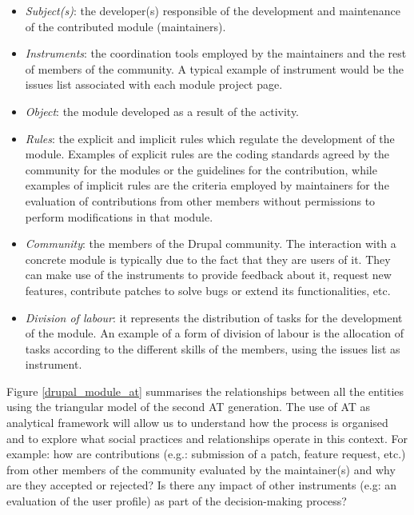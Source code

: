 \documentclass{sig-alternate}
\begin{document}
\begin{itemize}
	\item \textit{Subject(s)}: the developer(s) responsible of the development and maintenance of the contributed module (maintainers).
	\item \textit{Instruments}: the coordination tools employed by the maintainers and the rest of members of the community. A typical example of instrument would be the issues list associated with each module project page.
	\item \textit{Object}: the module developed as a result of the activity.
	\item \textit{Rules}: the explicit and implicit rules which regulate the development of the module. Examples of explicit rules are the coding standards agreed by the community for the modules or the guidelines for the contribution, while examples of implicit rules are the criteria employed by maintainers for the evaluation of contributions from other members without permissions to perform modifications in that module. 
	\item \textit{Community}: the members of the Drupal community. The interaction with a concrete module is typically due to the fact that they are users of it. They can make use of the instruments to provide feedback about it, request new features, contribute patches to solve bugs or extend its functionalities, etc. 
	\item \textit{Division of labour}: it represents the distribution of tasks for the development of the module. An example of a form of division of labour is the allocation of tasks according to the different skills of the members, using the issues list as instrument.
\end{itemize}

Figure \ref{drupal_module_at} summarises the relationships between all the entities using the triangular model of the second AT generation. The use of AT as analytical framework will allow us to understand how the process is organised and to explore what social practices and relationships operate in this context. For example: how are contributions (e.g.: submission of a patch, feature request, etc.) from other members of the community evaluated by the maintainer(s) and why are they accepted or rejected? Is there any impact of other instruments (e.g: an evaluation of the user profile) as part of the decision-making process?
\end{document}
